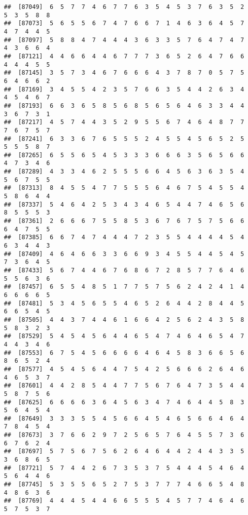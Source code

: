 \documentclass[
]{book}
\begin{document}
\begin{verbatim}
##  [87049]  6  5  7  7  4  6  7  7  6  3  5  4  5  3  7  6  3  5  2  5  3  5  8  8
##  [87073]  5  6  5  5  6  7  4  7  6  6  7  1  4  6  3  6  4  5  7  4  7  4  4  5
##  [87097]  5  8  8  4  7  4  4  4  3  6  3  3  5  7  6  4  7  4  7  4  3  6  6  4
##  [87121]  4  4  6  6  4  4  6  7  7  7  3  6  5  2  6  4  7  6  6  4  4  4  5  5
##  [87145]  3  5  7  3  4  6  7  6  6  6  4  3  7  8  7  0  5  7  5  6  4  6  6  2
##  [87169]  3  4  5  5  4  2  3  5  7  6  6  3  5  4  4  2  6  3  4  4  5  4  6  7
##  [87193]  6  6  3  6  5  8  5  6  8  5  6  5  6  4  6  3  3  4  4  3  6  7  3  1
##  [87217]  4  5  7  4  4  3  5  2  9  5  5  6  7  4  6  4  8  7  7  7  6  7  5  7
##  [87241]  6  3  3  6  7  6  5  5  5  2  4  5  5  4  5  6  5  2  5  5  5  5  8  7
##  [87265]  6  5  5  6  5  4  5  3  3  3  6  6  6  3  5  6  5  6  6  4  7  3  4  6
##  [87289]  4  3  3  4  6  2  5  5  5  6  6  4  5  6  3  6  3  5  4  5  6  7  5  5
##  [87313]  8  4  5  5  4  7  7  5  5  5  6  4  6  7  5  4  5  5  4  5  8  6  4  4
##  [87337]  5  4  6  4  2  5  3  4  3  4  6  5  4  4  7  4  6  5  6  8  5  5  5  3
##  [87361]  2  6  6  6  7  5  5  8  5  3  6  7  6  7  5  7  5  6  6  6  4  7  5  5
##  [87385]  6  6  7  4  7  4  4  4  7  2  3  5  5  4  4  4  4  5  4  6  3  4  4  3
##  [87409]  4  6  4  6  6  3  3  6  6  9  3  4  5  5  4  4  5  4  5  7  3  6  4  5
##  [87433]  5  6  7  4  4  6  7  6  8  6  7  2  8  5  7  7  6  4  6  5  5  6  3  6
##  [87457]  6  5  5  4  8  5  1  7  7  5  7  5  6  2  4  2  4  1  4  6  6  6  6  5
##  [87481]  5  3  4  5  6  5  5  4  6  5  2  6  4  4  2  8  4  4  5  6  6  5  4  5
##  [87505]  4  4  3  7  4  4  6  1  6  6  4  2  5  6  2  4  3  5  8  5  8  3  2  3
##  [87529]  5  4  5  4  5  6  4  4  6  5  4  7  4  6  4  6  5  4  7  4  4  3  4  6
##  [87553]  6  7  5  4  5  6  6  6  6  4  6  4  5  8  3  6  6  5  6  8  6  5  2  4
##  [87577]  4  5  4  5  6  4  4  7  5  4  2  5  6  6  6  2  6  4  6  4  6  5  3  7
##  [87601]  4  4  2  8  5  4  4  7  7  5  6  7  6  4  7  3  5  4  4  5  8  7  5  6
##  [87625]  6  6  6  6  3  6  4  5  6  3  4  7  4  6  4  4  5  8  3  5  6  4  5  4
##  [87649]  3  3  3  5  5  4  5  6  6  4  5  4  6  5  6  6  4  6  4  7  8  4  5  4
##  [87673]  3  7  6  6  2  9  7  2  5  6  5  7  6  4  5  5  7  3  6  6  7  6  2  4
##  [87697]  5  7  5  6  7  5  6  2  6  4  6  4  4  2  4  4  3  3  5  3  6  8  6  5
##  [87721]  5  7  4  4  2  6  7  3  5  3  7  5  4  4  4  5  4  6  4  5  6  4  4  6
##  [87745]  5  3  5  5  6  5  2  7  5  3  7  7  7  4  6  6  5  4  8  4  8  6  3  6
##  [87769]  4  4  4  5  4  4  6  6  5  5  5  4  5  7  7  4  6  4  6  5  7  5  3  7

\end{verbatim}
\end{document}
